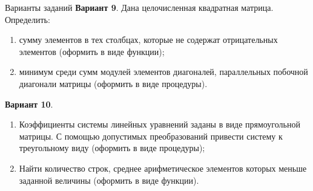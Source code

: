 \documentclass{beamer}
\begin{document}
\begin{frame}{Варианты заданий}
\textbf{Вариант 9}. Дана целочисленная квадратная матрица. Определить:
\begin{enumerate}
\item сумму элементов в тех столбцах, которые не содержат отрицательных элементов (оформить в виде функции);
\item минимум среди сумм модулей элементов диагоналей, параллельных побочной диагонали матрицы (оформить в виде процедуры).
\end{enumerate}
\textbf{Вариант 10}. 
\begin{enumerate}
\item Коэффициенты системы линейных уравнений заданы в виде прямоугольной матрицы. С помощью допустимых преобразований привести систему к треугольному виду (оформить в виде процедуры); 
\item Найти количество строк, среднее арифметическое элементов которых меньше заданной величины (оформить в виде функции).
\end{enumerate}
\end{frame}
\end{document}
